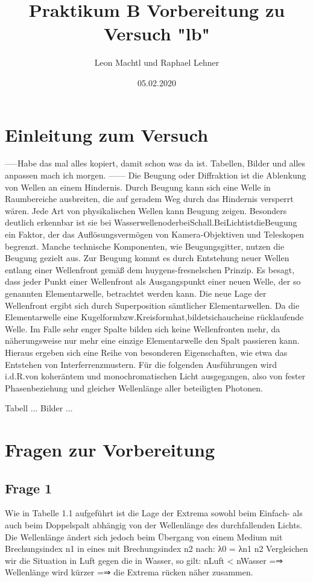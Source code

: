 \documentclass[a4paper,10pt]{scrartcl}
\title{Praktikum B Vorbereitung zu Versuch "lb"}
\author{Leon Machtl und Raphael Lehner}
\date{05.02.2020}
\begin{document}
	\maketitle
	\tableofcontents
	\newpage
	
	\section{Einleitung zum Versuch}
	-----Habe das mal alles kopiert, damit schon was da ist. Tabellen, Bilder und alles anpassen mach ich morgen. ------
	Die Beugung oder Diﬀraktion ist die Ablenkung von Wellen an einem Hindernis. Durch Beugung kann sich eine Welle in Raumbereiche ausbreiten, die auf geradem Weg durch das Hindernis versperrt wären. Jede Art von physikalischen Wellen kann Beugung zeigen. Besonders deutlich erkennbar ist sie bei WasserwellenoderbeiSchall.BeiLichtistdieBeugung ein Faktor, der das Auﬂösungsvermögen von Kamera-Objektiven und Teleskopen begrenzt. Manche technische Komponenten, wie Beugungsgitter, nutzen die Beugung gezielt aus. Zur Beugung kommt es durch Entstehung neuer Wellen entlang einer Wellenfront gemäß dem huygens-fresnelschen Prinzip. Es besagt, dass jeder Punkt einer Wellenfront als Ausgangspunkt einer neuen Welle, der so genannten Elementarwelle, betrachtet werden kann. Die neue Lage der Wellenfront ergibt sich durch Superposition sämtlicher Elementarwellen. Da die Elementarwelle eine Kugelformbzw.Kreisformhat,bildetsichaucheine rücklaufende Welle. Im Falle sehr enger Spalte bilden sich keine Wellenfronten mehr, da näherungsweise nur mehr eine einzige Elementarwelle den Spalt passieren kann. Hieraus ergeben sich eine Reihe von besonderen Eigenschaften, wie etwa das Entstehen von Interferrenzmustern. Für die folgenden Ausführungen wird i.d.R.von koheräntem und monochromatischen Licht ausgegangen, also von fester Phasenbeziehung und gleicher Wellenlänge aller beteiligten Photonen.
		
		Tabell ...
		Bilder ...
	\section{Fragen zur Vorbereitung}
		\subsection{Frage 1}
		Wie in Tabelle 1.1 aufgeführt ist die Lage der Extrema sowohl beim Einfach- als auch beim Doppelspalt abhängig von der Wellenlänge des durchfallenden Lichts. Die Wellenlänge ändert sich jedoch beim Übergang von einem Medium mit Brechungsindex n1 in eines mit Brechungsindex n2 nach: λ0 = λn1 n2 Vergleichen wir die Situation in Luft gegen die in Wasser, so gilt: nLuft < nWasser =⇒ Wellenlänge wird kürzer =⇒ die Extrema rücken näher zusammen.
\end{document}
